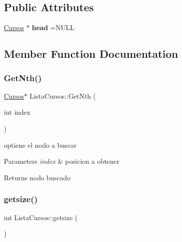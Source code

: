 \subsection*{Public Attributes}
\begin{DoxyCompactItemize}
\item 
\mbox{\label{classListaCursos_a193ef0ae3378067725e7d12b18a81bc3}} 
\hyperlink{classCursos}{Cursos} $\ast$ {\bfseries head} =N\+U\+LL
\end{DoxyCompactItemize}


\subsection{Member Function Documentation}
\mbox{\label{classListaCursos_a81dfb062a0308da32fd97ec25b7a84cc}} 
\subsubsection{\texorpdfstring{Get\+Nth()}{GetNth()}}
{\footnotesize\ttfamily \hyperlink{classCursos}{Cursos}$\ast$ Lista\+Cursos\+::\+Get\+Nth (\begin{DoxyParamCaption}\item[{int}]{index }\end{DoxyParamCaption})\hspace{0.3cm}{\ttfamily [inline]}}



optiene el nodo a buscar 


\begin{DoxyParams}{Parameters}
{\em index} & posicion a obtener \\
\hline
\end{DoxyParams}
\begin{DoxyReturn}{Returns}
nodo buscado 
\end{DoxyReturn}
\mbox{\label{classListaCursos_a8817e5ba536b0cd050eefb89400054d1}} 
\subsubsection{\texorpdfstring{getsize()}{getsize()}}
{\footnotesize\ttfamily int Lista\+Cursos\+::getsize (\begin{DoxyParamCaption}{ }\end{DoxyParamCaption})\hspace{0.3cm}{\ttfamily [inline]}}



